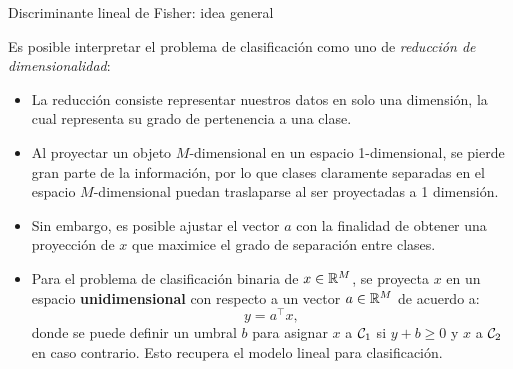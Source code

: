 \documentclass[9pt, handout]{beamer}
\begin{document}
\begin{frame}{Discriminante lineal de Fisher: idea general}
	
Es posible interpretar el problema de clasificación como uno de \emph{reducción de dimensionalidad}: \pause

\begin{itemize}
	\item La reducción consiste representar nuestros datos  en solo una dimensión, la cual representa su grado de pertenencia a una clase. \pause
	\item Al proyectar un objeto $M$-dimensional en un espacio  1-dimensional, se pierde gran parte de la información, por lo que clases claramente separadas en el espacio $M$-dimensional puedan traslaparse al ser proyectadas a 1 dimensión.\pause
	\item Sin embargo, es posible ajustar el vector $a$ con la finalidad de obtener una proyección de $x$ que maximice el grado de separación entre clases.\pause
	\item Para el problema de clasificación binaria de $x\in \mathbb{R}^M$, se proyecta $x$ en un espacio \textbf{unidimensional} con respecto a un vector $a\in\mathbb{R}^M$ de acuerdo a:
\begin{equation*}
	y = a^\top x,
\end{equation*}
donde se puede definir un umbral $b$ para asignar $x$ a ${\mathcal C}_1$ si $y+b\geq 0$ y $x$ a ${\mathcal C}_2$ en caso contrario. Esto recupera el modelo lineal para clasificación.
\end{itemize}
	
\end{frame}
\end{document}
